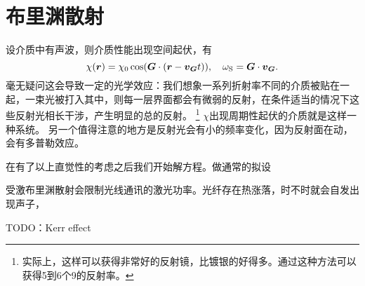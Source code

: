 \section{布里渊散射}

设介质中有声波，则介质性能出现空间起伏，有
\begin{equation}
    \chi(\vb*{r}) = \chi_0 \cos(\vb*{G} \cdot (\vb*{r} - \vb*{v}_{\vb*{G}} t)), \quad \omega_\text{S} = \vb*{G} \cdot \vb*{v}_{\vb*{G}}.
\end{equation}
毫无疑问这会导致一定的光学效应：我们想象一系列折射率不同的介质被贴在一起，一束光被打入其中，则每一层界面都会有微弱的反射，在条件适当的情况下这些反射光相长干涉，产生明显的总的反射。%
\footnote{
    实际上，这样可以获得非常好的反射镜，比镀银的好得多。通过这种方法可以获得5到6个9的反射率。
}%
$\chi$出现周期性起伏的介质就是这样一种系统。
另一个值得注意的地方是反射光会有小的频率变化，因为反射面在动，会有多普勒效应。

在有了以上直觉性的考虑之后我们开始解方程。做通常的拟设

受激布里渊散射会限制光线通讯的激光功率。光纤存在热涨落，时不时就会自发出现声子，

TODO：Kerr effect